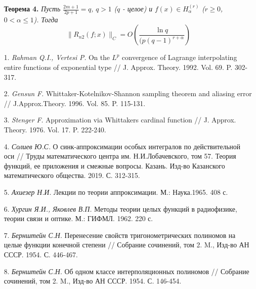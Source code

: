 \textbf{Теорема 4.} {\it Пусть $\frac{2m+1}{2p+1}=q$, $q > 1$ ($q$ - целое) и $f(x) \in H_{\alpha}^{(r)}$ ($r \geq 0$, $0< \alpha \leq 1$). Тогда}
$$ \|R_{n2}(f;x)\|_C = O\left(\frac{\ln{q}}{(p(q-1)^{r+\alpha}}\right)$$


\litlist

1. {\it Rahman Q.I., Vertesi P.} On the $L^p$ convergence of  Lagrange interpolating entire functions of exponential type // J. Approx. Theory. 1992. Vol. 69. P. 302-317.

2. {\it Gensun F.} Whittaker-Kotelnikov-Shannon sampling theorem and aliasing error // J.Approx.Theory. 1996. Vol. 85. P. 115-131.

3. {\it Stenger F.} Approximation via Whittakers cardinal function // J. Approx. Theory. 1976. Vol. 17. P. 222-240.


4. {\it Солиев Ю.С.} О синк-аппроксимации особых интегралов по действительной оси // Труды математического центра им. Н.И.Лобачевского, том 57. Теория функций, ее приложения и смежные вопросы. Казань. Изд-во Казанского математического общества. 2019. С. 312-315.

5. {\it Ахиезер Н.И.} Лекции по теории аппроксимации. М.: Наука.1965. 408 с.

6. {\it Хургин Я.И., Яковлев В.П.} Методы теории целых функций в радиофизике, теории связи и оптике. М.: ГИФМЛ. 1962. 220 с.

7. {\it Бернштейн С.Н.} Перенесение свойств тригонометрических полиномов на целые функции конечной степени // Собрание сочинений, том 2. M., Изд-во АН СССР. 1954. С. 446-467.

8. {\it Бернштейн С.Н.} Об одном классе интерполяционных полиномов // Собрание сочинений, том 2. M., Изд-во АН СССР. 1954. С. 146-454.
